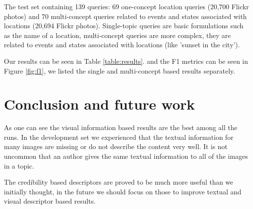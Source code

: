 \documentclass{acm_proc_article-me}
\begin{document}
The test set containing 139 queries: 69 one-concept location queries (20,700 Flickr photos) and 70 multi-concept queries related to events and states associated with locations (20,694 Flickr photos). Single-topic queries are basic formulations such as the name of a location, multi-concept queries are more complex, they are related to events and states associated with locations (like 'sunset in the city').

Our results can be seen in Table \ref{table:results}. and the F1 metrics can be seen in Figure \ref{fig:f1}, we listed the single and multi-concept based results separately. 

\section{Conclusion and future work}

As one can see the visual information based results are the best among all the runs. In the development set we experienced that the textual information for many images are missing or do not describe the content very well. It is not uncommon that an author gives the same textual information to all of the images in a topic.

The credibility based descriptors are proved to be much more useful than we initially thought, in the future we should focus on those to improve textual and visual descriptor based results.



\end{document}

